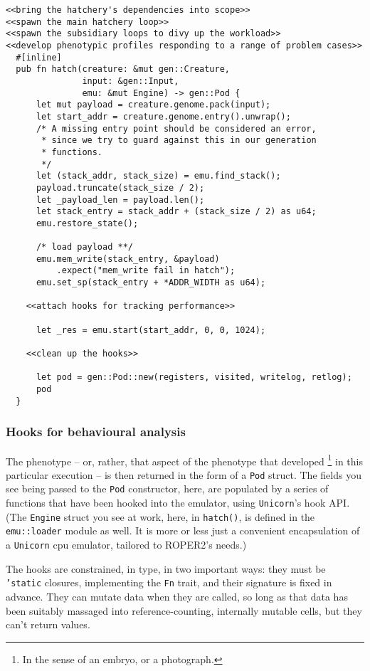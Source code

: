\documentclass[11pt]{article}
\begin{document}
\lstset{language=rust,label=org5b68901,caption= ,captionpos=b,numbers=none}
\begin{lstlisting}
<<bring the hatchery's dependencies into scope>>
<<spawn the main hatchery loop>>
<<spawn the subsidiary loops to divy up the workload>>
<<develop phenotypic profiles responding to a range of problem cases>>
  #[inline]
  pub fn hatch(creature: &mut gen::Creature, 
               input: &gen::Input, 
               emu: &mut Engine) -> gen::Pod {
      let mut payload = creature.genome.pack(input);
      let start_addr = creature.genome.entry().unwrap();
      /* A missing entry point should be considered an error,
       * since we try to guard against this in our generation
       * functions.
       */
      let (stack_addr, stack_size) = emu.find_stack();
      payload.truncate(stack_size / 2);
      let _payload_len = payload.len();
      let stack_entry = stack_addr + (stack_size / 2) as u64;
      emu.restore_state();

      /* load payload **/
      emu.mem_write(stack_entry, &payload)
          .expect("mem_write fail in hatch");
      emu.set_sp(stack_entry + *ADDR_WIDTH as u64);

    <<attach hooks for tracking performance>>

      let _res = emu.start(start_addr, 0, 0, 1024);

    <<clean up the hooks>>

      let pod = gen::Pod::new(registers, visited, writelog, retlog);
      pod
  }
\end{lstlisting}


\subsubsection{Hooks for behavioural analysis}
\label{sec:org58481a5}
The phenotype -- or, rather, that aspect of the phenotype that developed
\footnote{In the sense of an embryo, or a photograph.} in this particular execution
-- is then returned in the form of a \texttt{Pod} struct. The fields you see being
passed to the \texttt{Pod} constructor, here, are populated by a series of functions
that have been hooked into the emulator, using \texttt{Unicorn}'s hook API. (The
\texttt{Engine} struct you see at work, here, in \texttt{hatch()}, is defined in the
\texttt{emu::loader} module as well. It is more or less just a convenient 
encapsulation of a \texttt{Unicorn} \gls{cpu} emulator, tailored to ROPER2's needs.)

The hooks are constrained, in type, in two important ways: they must be
\texttt{'static} closures, implementing the \texttt{Fn} trait, and their signature is
fixed in advance. They can mutate data when they are called, so long as
that data has been suitably massaged into reference-counting, internally
mutable cells, but they can't return values. 
\end{document}
